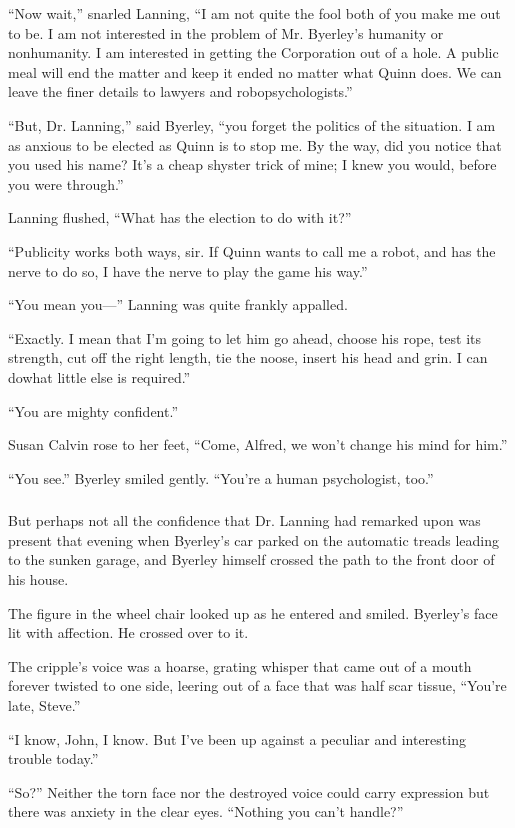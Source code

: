 \documentclass[10pt,a5paper,twoside]{book}
\begin{document}
“Now wait,” snarled Lanning, “I am not quite the fool both of you make me out to be. I am not interested in the problem of Mr. Byerley’s humanity or nonhumanity. I am interested in getting the Corporation out of a hole. A public meal will end the matter and keep it ended no matter what Quinn does. We can leave the finer details to lawyers and robopsychologists.”

“But, Dr. Lanning,” said Byerley, “you forget the politics of the situation. I am as anxious to be elected as Quinn is to stop me. By the way, did you notice that you used his name? It’s a cheap shyster trick of mine; I knew you would, before you were through.”

Lanning flushed, “What has the election to do with it?”

“Publicity works both ways, sir. If Quinn wants to call me a robot, and has the nerve to do so, I have the nerve to play the game his way.”

“You mean you—” Lanning was quite frankly appalled.

“Exactly. I mean that I’m going to let him go ahead, choose his rope, test its strength, cut off the right length, tie the noose, insert his head and grin. I can dowhat little else is required.”

“You are mighty confident.”

Susan Calvin rose to her feet, “Come, Alfred, we won’t change his mind for him.”

“You see.” Byerley smiled gently. “You’re a human psychologist, too.”

\subsubsection*{}
But perhaps not all the confidence that Dr. Lanning had remarked upon was present that evening when Byerley’s car parked on the automatic treads leading to the sunken garage, and Byerley himself crossed the path to the front door of his house.

The figure in the wheel chair looked up as he entered and smiled. Byerley’s face lit with affection. He crossed over to it.

The cripple’s voice was a hoarse, grating whisper that came out of a mouth forever twisted to one side, leering out of a face that was half scar tissue, “You’re late, Steve.”

“I know, John, I know. But I’ve been up against a peculiar and interesting trouble today.”

“So?” Neither the torn face nor the destroyed voice could carry expression but there was anxiety in the clear eyes. “Nothing you can’t handle?”
\end{document}
